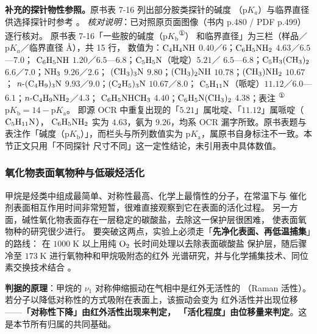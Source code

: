 \begin{crosscheck}
\textbf{补充的探针物性参照。}原书表 7-16 列出部分胺类探针的碱度
（$\mathrm{p}K_{a}$）与临界直径供选择探针时参考
。
\emph{核对说明}：已对照原页面图像（书内 p.480 / PDF p.499）逐行核对。
原书表 7-16「一些胺的碱度（$\mathrm{p}K_\mathrm{b}$\textsuperscript{①}）
和临界直径」为三栏（样品／$\mathrm{p}K_{a}$／临界直径 \AA{}），共 15 行，
数值为：$\ce{C4H4NH}$ $0.40$／$6$；$\ce{C6H5NH2}$ $4.63$／$6.5$—$7.0$；
$\ce{C6H5NH}$ $1.20$／$6.5$—$6.8$；$\ce{C5H5N}$（吡啶）$5.21$／
$6.5$—$6.8$；$\ce{C5H3(CH3)2}$ $6.6$／$7.0$；$\ce{NH3}$ $9.26$／$2.6$；
$\ce{(CH3)3N}$ $9.80$；$\ce{(CH3)2NH}$ $10.78$；$\ce{(CH3)NH2}$ $10.67$；
$n\text{-}\ce{(C4H9)3N}$ $9.93$／$9.0$；$\ce{(C2H5)3N}$ $10.67$／$8.0$；
$\ce{C5H11N}$（哌啶）$11.12$／$6.0$—$6.1$；$n\text{-}\ce{C4H9NH2}$／$4.3$；
$\ce{C6H5NHCH3}$ $4.40$；$\ce{C6H5N(CH3)2}$ $4.38$；表注
\textsuperscript{①}$\mathrm{p}K_\mathrm{b}=14-\mathrm{p}K_\mathrm{a}$。
即源 OCR 中重复出现的「$5.21$」属吡啶、「$11.12$」属哌啶（$\ce{C5H11N}$），
$\ce{C6H5NH2}$ 实为 $4.63$，氨为 $9.26$，均系 OCR 漏字所致。原书表题与
表注作「碱度（$\mathrm{p}K_\mathrm{b}$）」，而栏头与所列数值实为
$\mathrm{p}K_\mathrm{a}$，属原书自身标注不一致。本节正文只用「不同探针
尺寸不同」这一定性结论，未引用表中具体数值。
\end{crosscheck}

\subsubsection{氧化物表面氧物种与低碳烃活化}

\begin{principle}
甲烷是烃类中组成最简单、对称性最高、化学上最惰性的分子，在常温下与
催化剂表面相互作用时间非常短暂，很难直接观察到它在表面的活化过程。
另一方面，碱性氧化物表面存在一层稳定的碳酸盐，去除这一保护层很困难，
使表面氧物种的研究很少进行。
要突破这两点，实验上必须走「\textbf{先净化表面、再低温捕集}」的路线：
在 $1000\;\mathrm{K}$ 以上用纯 $\ce{O2}$ 长时间处理以去除表面碳酸盐
保护层，随后骤冷至 $173\;\mathrm{K}$ 进行氧物种和甲烷吸附态的红外
光谱研究，并与化学捕集技术、同位素交换技术结合
。

\textbf{判据的原理}：甲烷的 $\nu_{1}$ 对称伸缩振动在气相中是红外无活性的
（Raman 活性）。若分子以降低对称性的方式吸附在表面上，该振动会变为
红外活性并出现位移——\textbf{「对称性下降」由红外活性出现来判定，
「活化程度」由位移量来判定}。这是本节所有归属的共同基础。
\end{principle}


